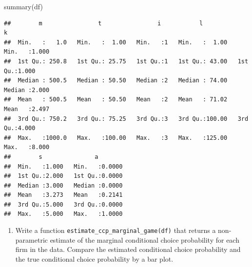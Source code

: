 \documentclass[
]{book}
\newenvironment{Shaded}{\begin{snugshade}}{\end{snugshade}}
\newcommand{\FunctionTok}[1]{\textcolor[rgb]{0.00,0.00,0.00}{#1}}
\newcommand{\NormalTok}[1]{#1}
\providecommand{\tightlist}{%
  \setlength{\itemsep}{0pt}\setlength{\parskip}{0pt}}
\begin{document}
\begin{Shaded}
\begin{Highlighting}[]
\FunctionTok{summary}\NormalTok{(df)}
\end{Highlighting}
\end{Shaded}

\begin{verbatim}
##        m                t                i           l                k        
##  Min.   :   1.0   Min.   :  1.00   Min.   :1   Min.   :  1.00   Min.   :1.000  
##  1st Qu.: 250.8   1st Qu.: 25.75   1st Qu.:1   1st Qu.: 43.00   1st Qu.:1.000  
##  Median : 500.5   Median : 50.50   Median :2   Median : 74.00   Median :2.000  
##  Mean   : 500.5   Mean   : 50.50   Mean   :2   Mean   : 71.02   Mean   :2.497  
##  3rd Qu.: 750.2   3rd Qu.: 75.25   3rd Qu.:3   3rd Qu.:100.00   3rd Qu.:4.000  
##  Max.   :1000.0   Max.   :100.00   Max.   :3   Max.   :125.00   Max.   :8.000  
##        s               a         
##  Min.   :1.000   Min.   :0.0000  
##  1st Qu.:2.000   1st Qu.:0.0000  
##  Median :3.000   Median :0.0000  
##  Mean   :3.273   Mean   :0.2141  
##  3rd Qu.:5.000   3rd Qu.:0.0000  
##  Max.   :5.000   Max.   :1.0000
\end{verbatim}

\begin{enumerate}
\def\labelenumi{\arabic{enumi}.}
\setcounter{enumi}{13}
\tightlist
\item
  Write a function \texttt{estimate\_ccp\_marginal\_game(df)} that returns a non-parametric estimate of the marginal conditional choice probability for each firm in the data. Compare the estimated conditional choice probability and the true conditional choice probability by a bar plot.
\end{enumerate}
\end{document}
